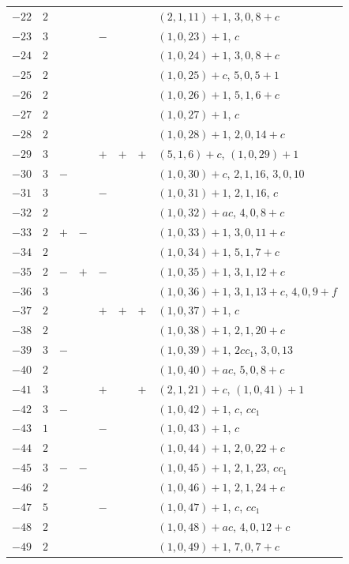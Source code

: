 \documentclass[11pt,a4paper]{article}
\begin{document}
\begin{longtable}{r|r|ccccc|>{\raggedright\arraybackslash}p{4.5cm}}
$-22$ & $2$ & & & & & & $(2,1,11)+1$, $3,0,8+c$ \\
$-23$ & $3$ & & & $-$ & & & $(1,0,23)+1$, $c$ \\
$-24$ & $2$ & & & & & & $(1,0,24)+1$, $3,0,8+c$ \\
$-25$ & $2$ & & & & & & $(1,0,25)+c$, $5,0,5+1$ \\
$-26$ & $2$ & & & & & & $(1,0,26)+1$, $5,1,6+c$ \\
$-27$ & $2$ & & & & & & $(1,0,27)+1$, $c$ \\
$-28$ & $2$ & & & & & & $(1,0,28)+1$, $2,0,14+c$ \\
$-29$ & $3$ & & & $+$ & $+$ & $+$ & $(5,1,6)+c$, $(1,0,29)+1$ \\
$-30$ & $3$ & $-$ & & & & & $(1,0,30)+c$, $2,1,16$, $3,0,10$ \\
$-31$ & $3$ & & & $-$ & & & $(1,0,31)+1$, $2,1,16$, $c$ \\
$-32$ & $2$ & & & & & & $(1,0,32)+ac$, $4,0,8+c$ \\
$-33$ & $2$ & $+$ & $-$ & & & & $(1,0,33)+1$, $3,0,11+c$ \\
$-34$ & $2$ & & & & & & $(1,0,34)+1$, $5,1,7+c$ \\
$-35$ & $2$ & $-$ & $+$ & $-$ & & & $(1,0,35)+1$, $3,1,12+c$ \\
$-36$ & $3$ & & & & & & $(1,0,36)+1$, $3,1,13+c$, $4,0,9+f$ \\
$-37$ & $2$ & & & $+$ & $+$ & $+$ & $(1,0,37)+1$, $c$ \\
$-38$ & $2$ & & & & & & $(1,0,38)+1$, $2,1,20+c$ \\
$-39$ & $3$ & $-$ & & & & & $(1,0,39)+1$, $2cc_1$, $3,0,13$ \\
$-40$ & $2$ & & & & & & $(1,0,40)+ac$, $5,0,8+c$ \\
$-41$ & $3$ & & & $+$ & & $+$ & $(2,1,21)+c$, $(1,0,41)+1$ \\
$-42$ & $3$ & $-$ & & & & & $(1,0,42)+1$, $c$, $cc_1$ \\
$-43$ & $1$ & & & $-$ & & & $(1,0,43)+1$, $c$ \\
$-44$ & $2$ & & & & & & $(1,0,44)+1$, $2,0,22+c$ \\
$-45$ & $3$ & $-$ & $-$ & & & & $(1,0,45)+1$, $2,1,23$, $cc_1$ \\
$-46$ & $2$ & & & & & & $(1,0,46)+1$, $2,1,24+c$ \\
$-47$ & $5$ & & & $-$ & & & $(1,0,47)+1$, $c$, $cc_1$ \\
$-48$ & $2$ & & & & & & $(1,0,48)+ac$, $4,0,12+c$ \\
$-49$ & $2$ & & & & & & $(1,0,49)+1$, $7,0,7+c$ \\

\end{longtable}
\end{document}
